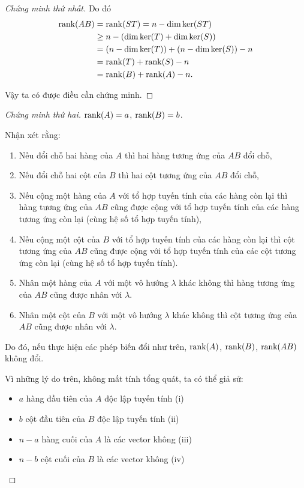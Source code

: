 \begin{proof}[Chứng minh thứ nhất]
    Do đó
    \begin{align*}
        \text{rank}(AB) & = \text{rank}(ST) = n - \dim\ker(ST) \\
                  & \geq n - (\dim\ker(T) + \dim\ker(S)) \\
                  & = (n - \dim\ker(T)) + (n - \dim\ker(S)) - n \\
                  & = \text{rank}(T) + \text{rank}(S) - n \\
                  & = \text{rank}(B) + \text{rank}(A) - n.
    \end{align*}

    Vậy ta có được điều cần chứng minh.
\end{proof}

\begin{proof}[Chứng minh thứ hai]
    $\text{rank}(A) = a$, $\text{rank}(B) = b$.
    
    Nhận xét rằng:
    \begin{enumerate}[label = (\roman*)]
        \item Nếu đổi chỗ hai hàng của $A$ thì hai hàng tương ứng của $AB$ đổi chỗ,
        \item Nếu đổi chỗ hai cột của $B$ thì hai cột tương ứng của $AB$ đổi chỗ,
        \item Nếu cộng một hàng của $A$ với tổ hợp tuyến tính của các hàng còn lại thì hàng tương ứng của $AB$ cũng được cộng với tổ hợp tuyến tính của các hàng tương ứng còn lại (cùng hệ số tổ hợp tuyến tính),
        \item Nếu cộng một cột của $B$ với tổ hợp tuyến tính của các hàng còn lại thì cột tương ứng của $AB$ cũng được cộng với tổ hợp tuyến tính của các cột tương ứng còn lại (cùng hệ số tổ hợp tuyến tính).
        \item Nhân một hàng của $A$ với một vô hướng $\lambda$ khác không thì hàng tương ứng của $AB$ cũng được nhân với $\lambda$.
        \item Nhân một cột của $B$ với một vô hướng $\lambda$ khác không thì cột tương ứng của $AB$ cũng được nhân với $\lambda$.
    \end{enumerate}
    
    Do đó, nếu thực hiện các phép biến đổi như trên, $\text{rank}(A)$, $\text{rank}(B)$, $\text{rank}(AB)$ không đổi.
    \bigskip
    
    Vì những lý do trên, không mất tính tổng quát, ta có thể giả sử:
    \begin{itemize}
        \item $a$ hàng đầu tiên của $A$ độc lập tuyến tính (i)
        \item $b$ cột đầu tiên của $B$ độc lập tuyến tính (ii)
        \item $n - a$ hàng cuối của $A$ là các vector không (iii)
        \item $n - b$ cột cuối của $B$ là các vector không (iv)
    \end{itemize}
    

\end{proof}
